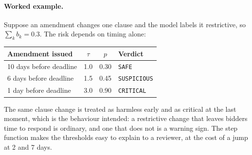 \paragraph{Worked example.} Suppose an amendment changes one clause and the model labels it restrictive, so $\sum_k b_k=0.3$. The risk depends on timing alone:
\begin{center}
\small
\begin{tabular}{@{}lccl@{}}
\toprule
\textbf{Amendment issued} & $\tau$ & $p$ & \textbf{Verdict} \\
\midrule
10 days before deadline & 1.0 & 0.30 & \texttt{SAFE} \\
6 days before deadline & 1.5 & 0.45 & \texttt{SUSPICIOUS} \\
1 day before deadline & 3.0 & 0.90 & \texttt{CRITICAL} \\
\bottomrule
\end{tabular}
\end{center}
The same clause change is treated as harmless early and as critical at the last moment, which is the behaviour intended: a restrictive change that leaves bidders time to respond is ordinary, and one that does not is a warning sign. The step function makes the thresholds easy to explain to a reviewer, at the cost of a jump at 2 and 7 days.
